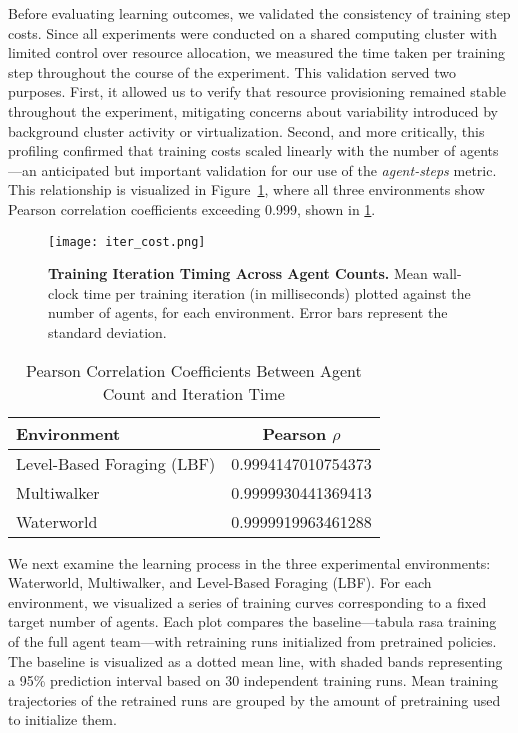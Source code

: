 \documentclass{article}
\begin{document}
Before evaluating learning outcomes, we validated the consistency of training step costs.
Since all experiments were conducted on a shared computing cluster with limited 
control over resource allocation, we measured the time taken per training
step throughout the course of the experiment. This validation served two purposes. First, 
it allowed us to verify that resource provisioning remained stable throughout the experiment, 
mitigating concerns about variability introduced by background cluster activity or virtualization.
Second, and more critically, this profiling confirmed that training costs scaled linearly 
with the number of agents—an anticipated but important validation for our use of the 
\emph{agent-steps} metric. This relationship is visualized in Figure~\ref{fig:agent-steps}, 
where all three environments show Pearson correlation coefficients exceeding 0.999,
shown in \ref{tab:pearson-corr}.
\begin{figure}[!h]
    \centering
    \texttt{[image: iter\_cost.png]}
    \caption{\textbf{Training Iteration Timing Across Agent Counts.}
        Mean wall-clock time per training iteration (in milliseconds) plotted against the number 
        of agents, for each environment. Error bars represent the standard deviation.}
    \label{fig:agent-steps}
\end{figure}
%
\begin{table}[h]
    \centering
    \begin{tabular}{lc}
        \toprule
        \textbf{Environment} & \textbf{Pearson $\rho$} \\
        \midrule
        Level-Based Foraging (LBF)  & 0.9994147010754373 \\
        Multiwalker                 & 0.9999930441369413 \\
        Waterworld                  & 0.9999919963461288 \\
        \bottomrule
    \end{tabular}
    \caption{Pearson Correlation Coefficients Between Agent Count and Iteration Time}
    \label{tab:pearson-corr}
\end{table}

We next examine the learning process in the three experimental environments: 
Waterworld, Multiwalker, and Level-Based Foraging (LBF). For each environment, 
we visualized a series of training curves corresponding to a fixed target number of agents.
Each plot compares the baseline—tabula rasa training of the full agent team—with 
retraining runs initialized from pretrained policies.
The baseline is visualized as a dotted mean line, with shaded bands 
representing a 95\% prediction interval based on 30 independent training runs.
Mean training trajectories of the retrained runs are grouped by the amount 
of pretraining used to initialize them.
\end{document}
